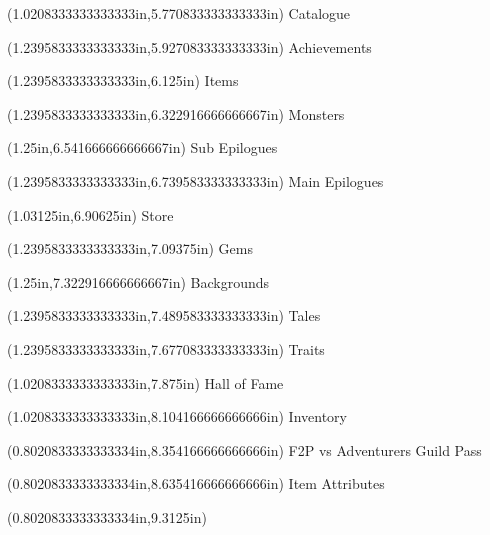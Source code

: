 \documentclass{article}
\begin{document}
\begin{textblock*}{8.0in}(1.0208333333333333in,5.770833333333333in)
\fontsize{12.75}{15.30}\selectfont
Catalogue
\end{textblock*}
\begin{textblock*}{8.0in}(1.2395833333333333in,5.927083333333333in)
\fontsize{10.50}{12.60}\selectfont
Achievements
\end{textblock*}
\begin{textblock*}{8.0in}(1.2395833333333333in,6.125in)
\fontsize{10.50}{12.60}\selectfont
Items
\end{textblock*}
\begin{textblock*}{8.0in}(1.2395833333333333in,6.322916666666667in)
\fontsize{10.50}{12.60}\selectfont
Monsters
\end{textblock*}
\begin{textblock*}{8.0in}(1.25in,6.541666666666667in)
\fontsize{12.75}{15.30}\selectfont
Sub Epilogues
\end{textblock*}
\begin{textblock*}{8.0in}(1.2395833333333333in,6.739583333333333in)
\fontsize{12.75}{15.30}\selectfont
Main Epilogues
\end{textblock*}
\begin{textblock*}{8.0in}(1.03125in,6.90625in)
\fontsize{10.50}{12.60}\selectfont
Store
\end{textblock*}
\begin{textblock*}{8.0in}(1.2395833333333333in,7.09375in)
\fontsize{10.50}{12.60}\selectfont
Gems
\end{textblock*}
\begin{textblock*}{8.0in}(1.25in,7.322916666666667in)
\fontsize{12.75}{15.30}\selectfont
Backgrounds
\end{textblock*}
\begin{textblock*}{8.0in}(1.2395833333333333in,7.489583333333333in)
\fontsize{10.50}{12.60}\selectfont
Tales
\end{textblock*}
\begin{textblock*}{8.0in}(1.2395833333333333in,7.677083333333333in)
\fontsize{10.50}{12.60}\selectfont
Traits
\end{textblock*}
\begin{textblock*}{8.0in}(1.0208333333333333in,7.875in)
\fontsize{10.50}{12.60}\selectfont
Hall of Fame
\end{textblock*}
\begin{textblock*}{8.0in}(1.0208333333333333in,8.104166666666666in)
\fontsize{12.75}{15.30}\selectfont
Inventory
\end{textblock*}
\begin{textblock*}{8.0in}(0.8020833333333334in,8.354166666666666in)
\fontsize{10.50}{12.60}\selectfont
F2P vs Adventurers Guild Pass
\end{textblock*}
\begin{textblock*}{8.0in}(0.8020833333333334in,8.635416666666666in)
\fontsize{10.50}{12.60}\selectfont
Item Attributes
\end{textblock*}
\begin{textblock*}{8.0in}(0.8020833333333334in,9.3125in)
\fontsize{10.50}{12.60}
\end{textblock*}
\end{document}
